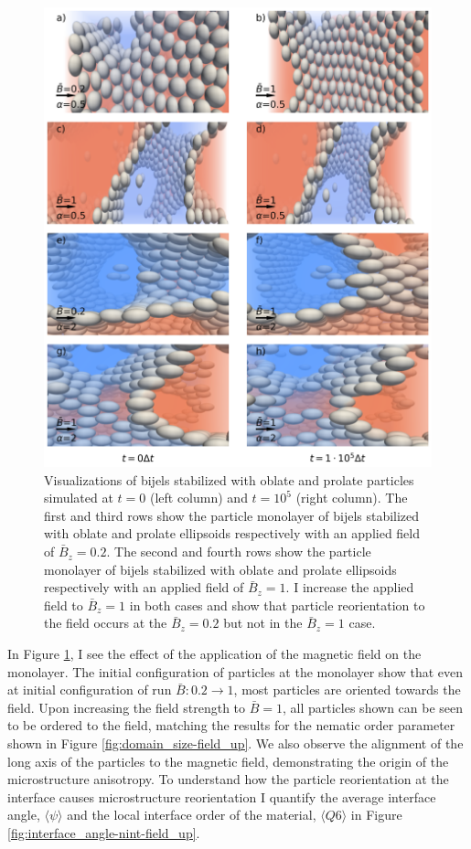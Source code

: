\begin{figure} 
\centering 
\includegraphics[scale=0.2]{../figures/results/paper2/particle_viz-field_up.png} 
\caption{Visualizations of bijels stabilized with oblate and prolate particles simulated at $t = 0$ (left column) and $t = 10^5$ (right column). 
         The first and third rows show the particle monolayer of bijels stabilized with oblate and prolate ellipsoids respectively with an applied 
         field of $\bar{B}_z = 0.2$. The second and fourth rows show the particle monolayer of bijels stabilized with oblate and prolate ellipsoids 
         respectively with an applied field of $\bar{B}_z = 1$. I increase the applied field to $\bar{B}_z = 1$ in both cases and show that particle 
         reorientation to the field occurs at the $\bar{B}_z = 0.2$ but not in the $\bar{B}_z = 1$ case.} 
\label{fig:particle_viz-field_up} 
\end{figure}

In Figure \ref{fig:particle_viz-field_up}, I see the effect of the
application of the magnetic field on the monolayer. The initial
configuration of particles at the monolayer show that even at initial
configuration of run $\bar{B}: 0.2 \rightarrow 1$, most particles are
oriented towards the field. Upon increasing the field strength to
$\bar{B} = 1$, all particles shown can be seen to be ordered to the
field, matching the results for the nematic order parameter shown in
Figure \ref{fig:domain_size-field_up}. We also observe the alignment of
the long axis of the particles to the magnetic field, demonstrating the
origin of the microstructure anisotropy. To understand how the particle
reorientation at the interface causes microstructure reorientation I
quantify the average interface angle, $\langle \psi \rangle$ and the
local interface order of the material, $\langle Q6 \rangle$ in Figure
\ref{fig:interface_angle-nint-field_up}.


